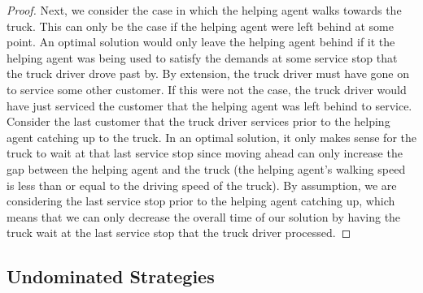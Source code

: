 \documentclass[12pt]{scrartcl}
\begin{document}
\begin{proof}
Next, we consider the case in which the helping agent walks towards the truck. This can only be the case if the helping agent were left behind at some point. An optimal solution would only leave the helping agent behind if it the helping agent was being used to satisfy the demands at some service stop that the truck driver drove past by. By extension, the truck driver must have gone on to service some other customer. If this were not the case, the truck driver would have just serviced the customer that the helping agent was left behind to service. Consider the last customer that the truck driver services prior to the helping agent catching up to the truck. In an optimal solution, it only makes sense for the truck to wait at that last service stop since moving ahead can only increase the gap between the helping agent and the truck (the helping agent's walking speed is less than or equal to the driving speed of the truck). By assumption, we are considering the last service stop prior to the helping agent catching up, which means that we can only decrease the overall time of our solution by having the truck wait at the last service stop that the truck driver processed.



\end{proof}


\subsection{Undominated Strategies}
\end{document}

